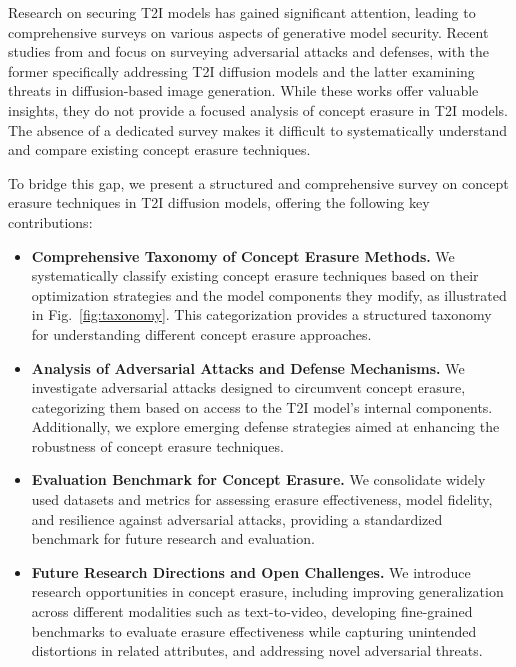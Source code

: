 Research on securing T2I models has gained significant attention, leading to comprehensive surveys on various aspects of generative model security. 
Recent studies from \cite{Zhang2024AdversarialAA} and \cite{Truong2024AttacksAD} focus on surveying adversarial attacks and defenses, with the former specifically addressing T2I diffusion models and the latter examining threats in diffusion-based image generation. While these works offer valuable insights, they do not provide a focused analysis of concept erasure in T2I models. The absence of a dedicated survey makes it difficult to systematically understand and compare existing concept erasure techniques. 

To bridge this gap, we present a structured and comprehensive survey on concept erasure techniques in T2I diffusion models, offering the following key contributions:
\begin{itemize}
    \item \textbf{Comprehensive Taxonomy of Concept Erasure Methods.} We systematically classify existing concept erasure techniques based on their optimization strategies and the model components they modify, as illustrated in Fig.~\ref{fig:taxonomy}. This categorization provides a structured taxonomy for understanding different concept erasure approaches.
    
    \item \textbf{Analysis of Adversarial Attacks and Defense Mechanisms.} We investigate adversarial attacks designed to circumvent concept erasure, categorizing them based on access to the T2I model’s internal components. Additionally, we explore emerging defense strategies aimed at enhancing the robustness of concept erasure techniques.
    
    \item \textbf{Evaluation Benchmark for Concept Erasure.} We consolidate widely used datasets and metrics for assessing erasure effectiveness, model fidelity, and resilience against adversarial attacks, providing a standardized benchmark for future research and evaluation.
    
    \item \textbf{Future Research Directions and Open Challenges.} We introduce research opportunities in concept erasure, including improving generalization across different modalities such as text-to-video, developing fine-grained benchmarks to evaluate erasure effectiveness while capturing unintended distortions in related attributes, and addressing novel adversarial threats.
    
\end{itemize}


